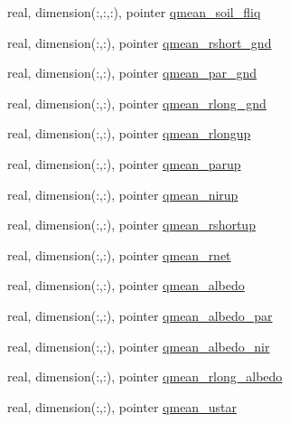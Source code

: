 \begin{DoxyCompactItemize}
\item 
real, dimension(\+:,\+:,\+:), pointer \hyperlink{structed__state__vars_1_1sitetype_a1fb5852010f610632cb48c31839d10ab}{qmean\+\_\+soil\+\_\+fliq}
\item 
real, dimension(\+:,\+:), pointer \hyperlink{structed__state__vars_1_1sitetype_ad44717f5af50bb5fffff92d4c1ff846f}{qmean\+\_\+rshort\+\_\+gnd}
\item 
real, dimension(\+:,\+:), pointer \hyperlink{structed__state__vars_1_1sitetype_a2638e742f70f64c0d4278c25502a1d84}{qmean\+\_\+par\+\_\+gnd}
\item 
real, dimension(\+:,\+:), pointer \hyperlink{structed__state__vars_1_1sitetype_a1d4af19edb8a58dec6cec2fe6906617c}{qmean\+\_\+rlong\+\_\+gnd}
\item 
real, dimension(\+:,\+:), pointer \hyperlink{structed__state__vars_1_1sitetype_a295b2b46fdf7db549cc68879fd9ba321}{qmean\+\_\+rlongup}
\item 
real, dimension(\+:,\+:), pointer \hyperlink{structed__state__vars_1_1sitetype_a9ade3740831550d8b97922974db1ca79}{qmean\+\_\+parup}
\item 
real, dimension(\+:,\+:), pointer \hyperlink{structed__state__vars_1_1sitetype_a50d9db864db8311a8197198d795fa7cb}{qmean\+\_\+nirup}
\item 
real, dimension(\+:,\+:), pointer \hyperlink{structed__state__vars_1_1sitetype_a84118aab8ef67cbced3b673542faea92}{qmean\+\_\+rshortup}
\item 
real, dimension(\+:,\+:), pointer \hyperlink{structed__state__vars_1_1sitetype_a7c33a786bdd234fa681234391ceadcba}{qmean\+\_\+rnet}
\item 
real, dimension(\+:,\+:), pointer \hyperlink{structed__state__vars_1_1sitetype_a8ca0d17aacd27ac7de3477cb30d60272}{qmean\+\_\+albedo}
\item 
real, dimension(\+:,\+:), pointer \hyperlink{structed__state__vars_1_1sitetype_a0a515bdc57d9e76a4e1b88865f493525}{qmean\+\_\+albedo\+\_\+par}
\item 
real, dimension(\+:,\+:), pointer \hyperlink{structed__state__vars_1_1sitetype_ab510d2bdb8d2673cdbd6dc86ded2a05c}{qmean\+\_\+albedo\+\_\+nir}
\item 
real, dimension(\+:,\+:), pointer \hyperlink{structed__state__vars_1_1sitetype_a6ea0d98fb2592f0e133d346bd096a357}{qmean\+\_\+rlong\+\_\+albedo}
\item 
real, dimension(\+:,\+:), pointer \hyperlink{structed__state__vars_1_1sitetype_ab24d1470dd63230c26d151e4a1e7bcc9}{qmean\+\_\+ustar}
\item 

\end{DoxyCompactItemize}
